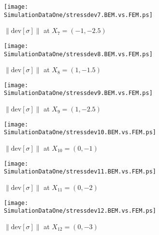 \begin{figure}[h]
\begin{minipage}[c]{7.5cm}
\texttt{[image: \\SimulationDataOne/stressdev7.BEM.vs.FEM.ps]}
\caption{$\|\mbox{dev}[\sigma]\|$ at $X_7=(-1,-2.5)$}
\end{minipage}
\begin{minipage}[c]{7.5cm}
\texttt{[image: \\SimulationDataOne/stressdev8.BEM.vs.FEM.ps]}
\caption{$\|\mbox{dev}[\sigma]\|$ at $X_8=(1,-1.5)$}
\end{minipage}

\begin{minipage}[c]{7.5cm}
\texttt{[image: \\SimulationDataOne/stressdev9.BEM.vs.FEM.ps]}
\caption{$\|\mbox{dev}[\sigma]\|$ at $X_9=(1,-2.5)$}
\end{minipage}
\begin{minipage}[c]{7.5cm}
\texttt{[image: \\SimulationDataOne/stressdev10.BEM.vs.FEM.ps]}
\caption{$\|\mbox{dev}[\sigma]\|$ at $X_{10}=(0,-1)$}
\end{minipage}

\begin{minipage}[c]{7.5cm}
\texttt{[image: \\SimulationDataOne/stressdev11.BEM.vs.FEM.ps]}
\caption{$\|\mbox{dev}[\sigma]\|$ at $X_{11}=(0,-2)$}
\end{minipage}
\begin{minipage}[c]{7.5cm}
\texttt{[image: \\SimulationDataOne/stressdev12.BEM.vs.FEM.ps]}
\caption{$\|\mbox{dev}[\sigma]\|$ at $X_{12}=(0,-3)$}\label{fig:Ex2:StressDeviator:CharacteristicPoint12}
\end{minipage}
\end{figure}

\clearpage



